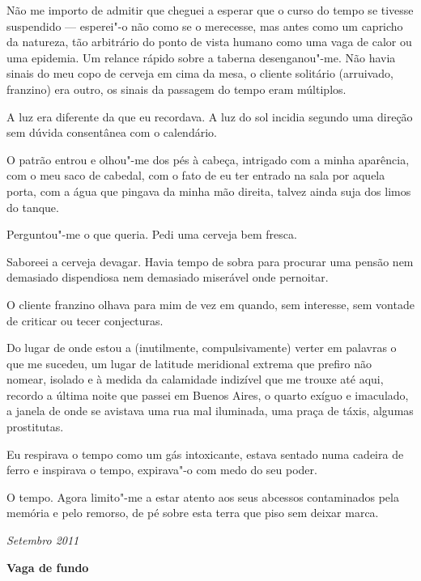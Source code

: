 Não me importo de admitir que cheguei a esperar que o
curso do tempo se tivesse suspendido --- esperei"-o não como se o
merecesse, mas antes como um capricho da natureza, tão arbitrário do
ponto de vista humano como uma vaga de calor ou uma epidemia. Um relance
rápido sobre a taberna desenganou"-me. Não havia sinais do meu copo de
cerveja em cima da mesa, o cliente solitário (arruivado, franzino) era
outro, os sinais da passagem do tempo eram múltiplos.

A luz era diferente da que eu recordava. A luz do sol incidia segundo
uma direção sem dúvida consentânea com o calendário.

O patrão entrou e olhou"-me dos pés à cabeça, intrigado com a minha
aparência, com o meu saco de cabedal, com o fato de eu ter entrado na
sala por aquela porta, com a água que pingava da minha mão direita,
talvez ainda suja dos limos do tanque.

Perguntou"-me o que queria. Pedi uma cerveja bem fresca.

Saboreei a
cerveja devagar. Havia tempo de sobra para procurar uma pensão nem
demasiado dispendiosa nem demasiado miserável onde pernoitar.

O cliente franzino olhava para mim de vez em quando, sem interesse, sem
vontade de criticar ou tecer conjecturas.

Do lugar de onde estou a (inutilmente, compulsivamente) verter em
palavras o que me sucedeu, um lugar de latitude meridional extrema que
prefiro não nomear, isolado e à medida da calamidade indizível que me
trouxe até aqui, recordo a última noite que passei em Buenos Aires, o
quarto exíguo e imaculado, a janela de onde se avistava uma rua mal
iluminada, uma praça de táxis, algumas prostitutas.

Eu respirava o tempo como um gás intoxicante, estava sentado numa
cadeira de ferro e inspirava o tempo, expirava"-o com medo do seu poder.

O tempo. Agora limito"-me a estar atento aos seus abcessos contaminados
pela memória e pelo remorso, de pé sobre esta terra que piso sem deixar
marca.

\begin{flushright}
\emph{Setembro 2011}
\end{flushright}
\pagebreak
\thispagestyle{empty}

\movetooddpage\vspace*{1.8cm}
\noindent{}\textbf{Vaga de fundo}
\bigskip

